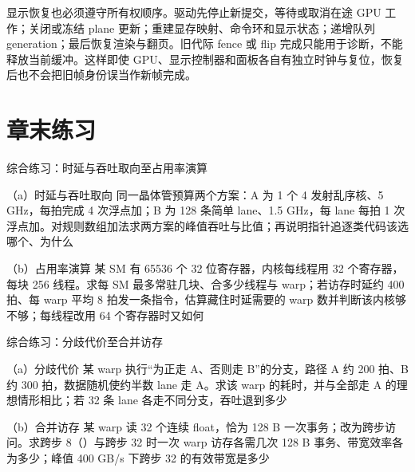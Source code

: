 显示恢复也必须遵守所有权顺序。驱动先停止新提交，等待或取消在途 GPU 工作；关闭或冻结 plane 更新；重建显存映射、命令环和显示状态；递增队列 generation；最后恢复渲染与翻页。旧代际 fence 或 flip 完成只能用于诊断，不能释放当前缓冲。这样即使 GPU、显示控制器和面板各自有独立时钟与复位，恢复后也不会把旧帧身份误当作新帧完成。

\section*{章末练习}

\begin{chapterexercise}{综合练习：时延与吞吐取向至占用率演算}
\begin{exercisesubproblem}{（a）时延与吞吐取向}
同一晶体管预算两个方案：A 为 1 个 4 发射乱序核、5 GHz，每拍完成 4 次浮点加；B 为 128 条简单 lane、1.5 GHz，每 lane 每拍 1 次浮点加。对规则数组加法求两方案的峰值吞吐与比值；再说明指针追逐类代码该选哪个、为什么
\end{exercisesubproblem}
\begin{exercisesubproblem}{（b）占用率演算}
某 SM 有 65536 个 32 位寄存器，内核每线程用 32 个寄存器，每块 256 线程。求每 SM 最多常驻几块、合多少线程与 warp；若访存时延约 400 拍、每 warp 平均 8 拍发一条指令，估算藏住时延需要的 warp 数并判断该内核够不够；每线程改用 64 个寄存器时又如何
\end{exercisesubproblem}
\end{chapterexercise}

\begin{chapterexercise}{综合练习：分歧代价至合并访存}
\begin{exercisesubproblem}{（a）分歧代价}
某 warp 执行“为正走 A、否则走 B”的分支，路径 A 约 200 拍、B 约 300 拍，数据随机使约半数 lane 走 A。求该 warp 的耗时，并与全部走 A 的理想情形相比；若 32 条 lane 各走不同分支，吞吐退到多少
\end{exercisesubproblem}
\begin{exercisesubproblem}{（b）合并访存}
某 warp 读 32 个连续 float，恰为 128 B 一次事务；改为跨步访问。求跨步 8（）与跨步 32 时一次 warp 访存各需几次 128 B 事务、带宽效率各为多少；峰值 400 GB/s 下跨步 32 的有效带宽是多少
\end{exercisesubproblem}
\end{chapterexercise}

